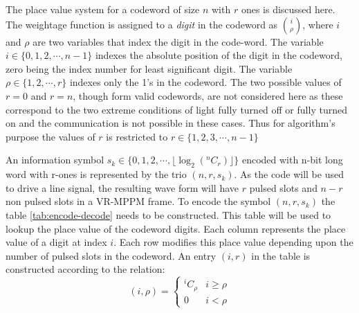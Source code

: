 The place value system for a codeword of size $n$ with $r$ ones is discussed here. The weightage function is assigned to a \emph{digit} in the codeword as $\binom{i}{\rho}$, where $i$ and $\rho$ are two variables that index the digit in the code-word. The variable $i \in \{ 0,1,2,\cdots,n-1\}$ indexes the absolute  position of the digit in the codeword, zero being the index number for least significant digit. The variable $\rho \in \{1,2,\cdots,r\}$ indexes only the 1's in the codeword. The two possible values of $r = 0$ and $r = n$, though form valid codewords, are not considered here as these correspond to the two extreme conditions of light fully turned off or fully turned on and the communication is not possible in these cases. Thus for algorithm's purpose the values of $r$ is restricted to $r \in \{1,2,3,\cdots,n-1 \}$

An information symbol $s_k \in \{0,1,2,\cdots,\lfloor \log_2(^nC_r) \rfloor \}$ encoded with n-bit long word with r-ones is represented by the trio $(n,r,s_k)$. As the code will be used to drive a line signal, the resulting wave form will have $r$ pulsed slots and $n-r$ non pulsed slots in a VR-MPPM frame. To encode the symbol $(n,r,s_k)$ the table \ref{tab:encode-decode} needs to be constructed. This table will be used to lookup the place value of the codeword digits. Each column represents the place value of a digit at index $i$. Each row modifies this place value depending upon the number of pulsed slots in the codeword. An entry $(i,r)$ in the table is constructed according to the relation:
\begin{equation}
\label{eq:placeValue}
    (i,\rho) = \left\{\begin{array}{cc}
    ^{i}C_\rho & i \geq \rho \\
	0 & i < \rho
\end{array}   \right.
\end{equation}

